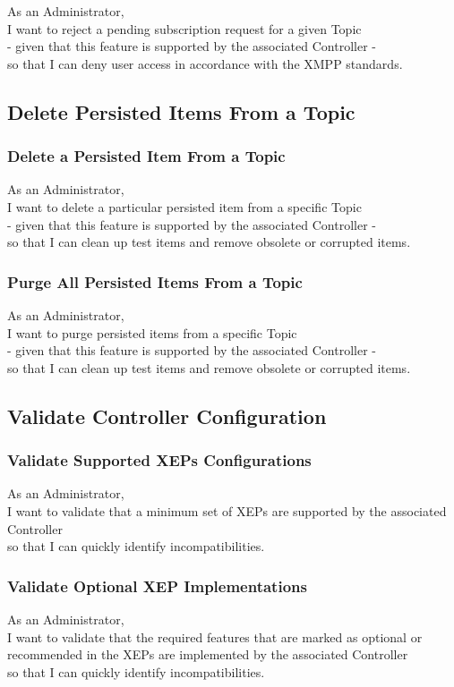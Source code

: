 As an Administrator,\\
I want to reject a pending subscription request for a given Topic\\
- given that this feature is supported by the associated Controller -\\
so that I can deny user access in accordance with the XMPP standards.

\subsection{Delete Persisted Items From a Topic}

\subsubsection{Delete a Persisted Item From a Topic}

As an Administrator,\\
I want to delete a particular persisted item from a specific Topic\\
- given that this feature is supported by the associated Controller -\\
so that I can clean up test items and remove obsolete or corrupted items.

\subsubsection{Purge All Persisted Items From a Topic}

As an Administrator,\\
I want to purge persisted items from a specific Topic\\
- given that this feature is supported by the associated Controller -\\
so that I can clean up test items and remove obsolete or corrupted items.

\subsection{Validate Controller Configuration}

\subsubsection{Validate Supported XEPs Configurations}
As an Administrator,\\
I want to validate that a minimum set of XEPs are supported by the associated Controller\\
so that I can quickly identify incompatibilities.

\subsubsection{Validate Optional XEP Implementations}
As an Administrator,\\
I want to validate that the required features that are marked as optional or recommended in the XEPs are implemented by the associated Controller\\
so that I can quickly identify incompatibilities.

